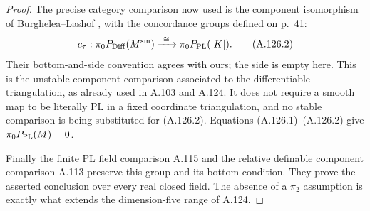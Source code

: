 \begin{proof}
The precise category comparison now used is the component
isomorphism of Burghelea--Lashof
\cite[Theorem~6.1, p.~41, and proof pp.~42--43]{BurgheleaLashof1974II},
with the concordance groups defined on p.~41:
\[
 c_\tau:\pi_0P_{\rm Diff}(M^{\rm sm})
       \xrightarrow{\ \cong\ }\pi_0P_{\rm PL}(|K|).    \tag{A.126.2}
\]
Their bottom-and-side convention agrees with ours; the side is
empty here. This is the unstable component comparison associated
to the differentiable triangulation, as already used in A.103 and
A.124. It does not require a smooth map to be literally PL in a
fixed coordinate triangulation, and no stable comparison is being
substituted for (A.126.2). Equations (A.126.1)--(A.126.2) give
$\pi_0P_{\rm PL}(M)=0$.

Finally the finite PL field comparison A.115 and the relative
definable component comparison A.113 preserve this group and its
bottom condition. They prove the asserted conclusion over every
real closed field. The absence of a $\pi_2$ assumption is exactly
what extends the dimension-five range of A.124.
\end{proof}
